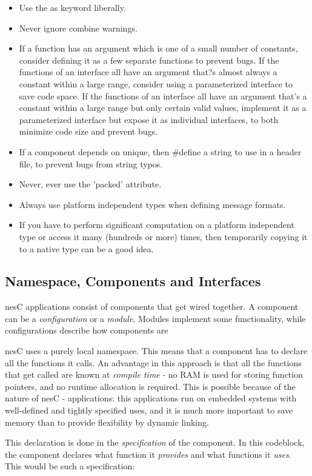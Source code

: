 \begin{itemize}
 \item Use the as keyword liberally.
 \item Never ignore combine warnings.
 \item If a function has an argument which is one of a small number of constants, consider
defining it as a few separate functions to prevent bugs. If the functions of an interface all have an argument
that?s almost always a constant within a large range, consider using a parameterized interface to save code
space. If the functions of an interface all have an argument that's a constant within a large range but only
certain valid values, implement it as a parameterized interface but expose it as individual interfaces, to both
minimize code size and prevent bugs.
 \item If a component depends on unique, then \#define a string to use in a header file, to
prevent bugs from string typos.
 \item Never, ever use the 'packed' attribute.
 \item Always use platform independent types when defining message formats.
 \item If you have to perform significant computation on a platform independent type or
access it many (hundreds or more) times, then temporarily copying it to a native type can be a good idea.


\end{itemize}

\subsection{Namespace, Components and Interfaces}

nesC applications consist of components that get wired together. A component can be a \textit{configuration} or a \textit{module}. Modules implement some functionality, while configurations describe how components are 

nesC uses a purely local namespace. This means that a component has to declare all the functions it calls. An advantage in this approach is that all the functions that get called are known at \textit{compile time} - no RAM is used for storing function pointers, and no runtime allocation is required. This is possible because of the nature of nesC - applications: this applications run on embedded systems with well-defined and tightly specified uses, and it is much more important to save memory than to provide flexibility by dynamic linking.

This declaration is done in the \textit{specification} of the component. In this codeblock, the component declares what function it \textit{provides} and what functions it \textit{uses}. This would be such a specification:

